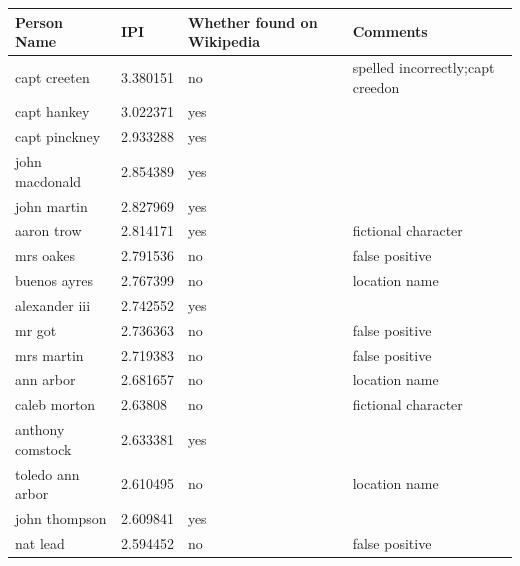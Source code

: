 \documentclass[10pt,journal,compsoc]{IEEEtran}
\begin{document}
\begin{table}
\centering
\begin{tabular}{|l|l|p{3cm}|p{3cm}|}
\hline
\textbf{Person Name}      & \textbf{IPI}      & \textbf{Whether found on Wikipedia} & \textbf{Comments}                                     \\ \hline
capt creeten     & 3.380151 & no                 & spelled incorrectly;capt creedon \\ \hline
capt hankey      & 3.022371 & yes                &                                      \\ \hline
capt pinckney    & 2.933288 & yes                &                                      \\ \hline
john macdonald   & 2.854389 & yes                &                                      \\ \hline
john martin      & 2.827969 & yes                &                                      \\ \hline
aaron trow       & 2.814171 & yes                & fictional character                  \\ \hline
mrs oakes        & 2.791536 & no                 & false positive                       \\ \hline
buenos ayres     & 2.767399 & no                 & location name                            \\ \hline
alexander iii    & 2.742552 & yes                &                                      \\ \hline
mr got           & 2.736363 & no                 & false positive                       \\ \hline
mrs martin       & 2.719383 & no                 & false positive                       \\ \hline
ann arbor        & 2.681657 & no                 & location name                            \\ \hline
caleb morton     & 2.63808  & no                 & fictional character                  \\ \hline
anthony comstock & 2.633381 & yes                &                                      \\ \hline
toledo ann arbor & 2.610495 & no                 & location name                            \\ \hline
john thompson    & 2.609841 & yes                &                                      \\ \hline
nat lead         & 2.594452 & no                 & false positive                       \\ \hline

\end{tabular}
\end{table}
\end{document}
